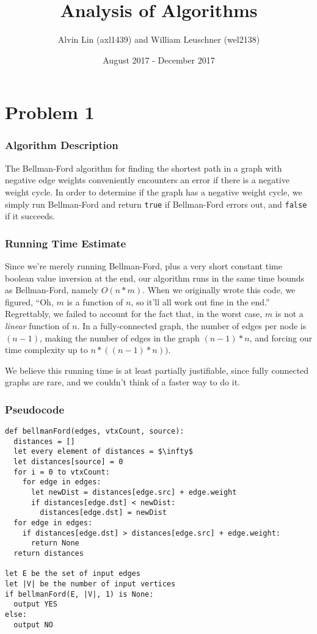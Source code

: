 \documentclass{math}
\title{Analysis of Algorithms}
\author{Alvin Lin (axl1439) and William Leuschner (wel2138)}
\date{August 2017 - December 2017}
\begin{document}
\maketitle

\section*{Problem 1}

\subsubsection*{Algorithm Description}
The Bellman-Ford algorithm for finding the shortest path in a graph with
negative edge weights conveniently encounters an error if there is a negative
weight cycle.  In order to determine if the graph has a negative weight cycle,
we simply run Bellman-Ford and return \texttt{true} if Bellman-Ford errors out,
and \texttt{false} if it succeeds.

\subsubsection*{Running Time Estimate}
Since we're merely running Bellman-Ford, plus a very short constant time boolean
value inversion at the end, our algorithm runs in the same time bounds as
Bellman-Ford, namely \( O(n*m) \).  When we originally wrote this code, we
figured, ``Oh, \( m \) is a function of \( n \), so it'll all work out fine in
the end.''  Regrettably, we failed to account for the fact that, in the worst
case, \( m \) is not a \emph{linear} function of \( n \).  In a fully-connected
graph, the number of edges per node is \( (n - 1) \), making the number of edges
in the graph \( (n - 1) * n \), and forcing our time complexity up to \( n * ((n
- 1) * n)) \).

We believe this running time is at least partially justifiable, since fully
connected graphs are rare, and we couldn't think of a faster way to do it.

\subsubsection*{Pseudocode}

\begin{lstlisting}[mathescape=true]
def bellmanFord(edges, vtxCount, source):
  distances = []
  let every element of distances = $\infty$
  let distances[source] = 0
  for i = 0 to vtxCount:
    for edge in edges:
      let newDist = distances[edge.src] + edge.weight
      if distances[edge.dst] < newDist:
        distances[edge.dst] = newDist
  for edge in edges:
    if distances[edge.dst] > distances[edge.src] + edge.weight:
      return None
  return distances

let E be the set of input edges
let |V| be the number of input vertices
if bellmanFord(E, |V|, 1) is None:
  output YES
else:
  output NO
\end{lstlisting}
\end{document}
